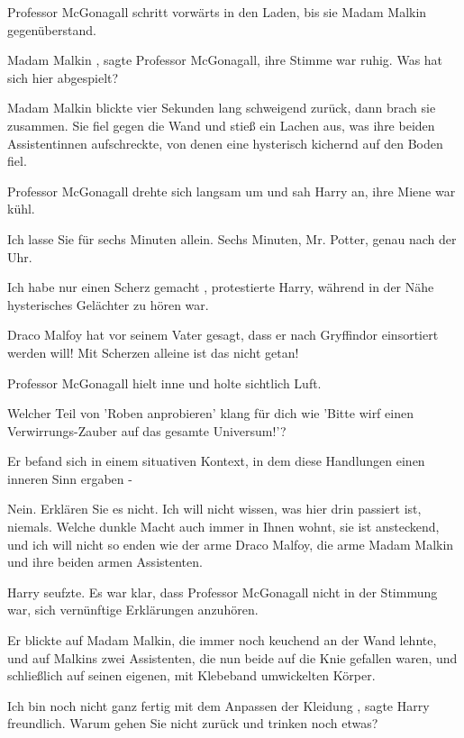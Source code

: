 Professor McGonagall schritt vorwärts in den Laden, bis sie
Madam Malkin gegenüberstand.

\glqq Madam Malkin\grqq{} , sagte Professor McGonagall, ihre Stimme war ruhig.
\glqq Was hat sich hier abgespielt?\grqq{}

Madam Malkin blickte vier Sekunden lang schweigend zurück, dann
brach sie zusammen. Sie fiel gegen die Wand und stieß ein Lachen aus, was ihre beiden Assistentinnen aufschreckte, von
denen eine hysterisch kichernd auf den Boden fiel.

Professor McGonagall drehte sich langsam um und sah Harry
an, ihre Miene war kühl.

\glqq Ich lasse Sie für sechs Minuten allein. Sechs Minuten, Mr. Potter, genau nach
der Uhr.\grqq{}

\glqq Ich habe nur einen Scherz gemacht\grqq{} , protestierte Harry, während in der Nähe
hysterisches Gelächter zu hören war.

\glqq Draco Malfoy hat vor seinem Vater gesagt, dass er nach Gryffindor
einsortiert werden will! Mit Scherzen alleine ist das nicht getan!\grqq{}

Professor McGonagall hielt inne und
holte sichtlich Luft.

\glqq Welcher Teil von 'Roben anprobieren' klang für dich wie 'Bitte wirf einen
Verwirrungs-Zauber auf das gesamte Universum!'?\grqq{}

\glqq Er befand sich in einem situativen Kontext, in
dem diese Handlungen einen inneren Sinn ergaben -\grqq{}

\glqq Nein. Erklären Sie es nicht. Ich will nicht
wissen, was hier drin passiert ist, niemals. Welche dunkle Macht auch immer in Ihnen wohnt, sie ist ansteckend, und ich
will nicht so enden wie der arme Draco Malfoy, die arme Madam Malkin und ihre beiden armen Assistenten.\grqq{}

Harry seufzte. Es war klar, dass Professor McGonagall nicht in der Stimmung war, sich vernünftige
Erklärungen anzuhören.

Er blickte auf Madam Malkin, die immer noch keuchend an der Wand lehnte, und auf
Malkins zwei Assistenten, die nun beide auf die Knie gefallen waren, und schließlich auf seinen eigenen, mit Klebeband
umwickelten Körper.

\glqq Ich bin noch nicht ganz fertig mit dem Anpassen der Kleidung\grqq{} , sagte Harry
freundlich. \glqq Warum gehen Sie nicht zurück und trinken noch etwas?\grqq{}